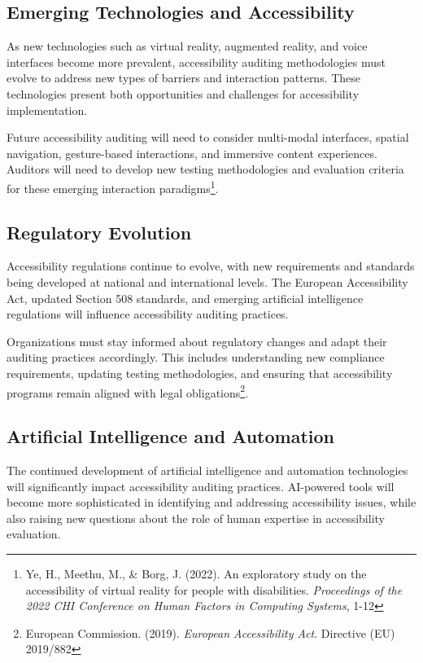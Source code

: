 \subsection{Emerging Technologies and Accessibility}

As new technologies such as virtual reality, augmented reality, and voice interfaces become more prevalent, accessibility auditing methodologies must evolve to address new types of barriers and interaction patterns. These technologies present both opportunities and challenges for accessibility implementation.

Future accessibility auditing will need to consider multi-modal interfaces, spatial navigation, gesture-based interactions, and immersive content experiences. Auditors will need to develop new testing methodologies and evaluation criteria for these emerging interaction paradigms\footnote{Ye, H., Meethu, M., \& Borg, J. (2022). An exploratory study on the accessibility of virtual reality for people with disabilities. \textit{Proceedings of the 2022 CHI Conference on Human Factors in Computing Systems}, 1-12}.

\subsection{Regulatory Evolution}

Accessibility regulations continue to evolve, with new requirements and standards being developed at national and international levels. The European Accessibility Act, updated Section 508 standards, and emerging artificial intelligence regulations will influence accessibility auditing practices.

Organizations must stay informed about regulatory changes and adapt their auditing practices accordingly. This includes understanding new compliance requirements, updating testing methodologies, and ensuring that accessibility programs remain aligned with legal obligations\footnote{European Commission. (2019). \textit{European Accessibility Act}. Directive (EU) 2019/882}.

\subsection{Artificial Intelligence and Automation}

The continued development of artificial intelligence and automation technologies will significantly impact accessibility auditing practices. AI-powered tools will become more sophisticated in identifying and addressing accessibility issues, while also raising new questions about the role of human expertise in accessibility evaluation.


